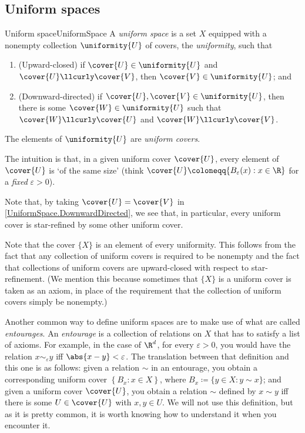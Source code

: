 \subsection{Uniform spaces}

\begin{dfn}{Uniform space}{UniformSpace}
A \emph{uniform space} is a set $X$ equipped with a nonempty collection $\uniformity{U}$ of covers, the \emph{uniformity}, such that
\begin{enumerate}
\item \label{UniformSpace.UpwardClosed}(Upward-closed) if $\cover{U}\in \uniformity{U}$ and $\cover{U}\llcurly \cover{V}$, then $\cover{V}\in \uniformity{U}$; and
\item \label{UniformSpace.DownwardDirected}(Downward-directed) if $\cover{U},\cover{V}\in \uniformity{U}$, then there is some $\cover{W}\in \uniformity{U}$ such that $\cover{W}\llcurly \cover{U}$ and $\cover{W}\llcurly \cover{V}$.
\end{enumerate}
\begin{rmk}
The elements of $\uniformity{U}$ are \emph{uniform covers}.
\end{rmk}
\begin{rmk}
The intuition is that, in a given uniform cover $\cover{U}$, every element of $\cover{U}$ is `of the same size' (think $\cover{U}\coloneqq \{ B_{\varepsilon}(x):x\in \R \}$ for a \emph{fixed} $\varepsilon >0$).
\end{rmk}
\begin{rmk}
Note that, by taking $\cover{U}=\cover{V}$ in \cref{UniformSpace.DownwardDirected}, we see that, in particular, every uniform cover is star-refined by some other uniform cover.
\end{rmk}
\begin{rmk}
Note that the cover $\{ X\}$ is an element of every uniformity.  This follows from the fact that any collection of uniform covers is required to be nonempty and the fact that collections of uniform covers are upward-closed with respect to star-refinement.  (We mention this because sometimes that $\{ X\}$ is a uniform cover is taken as an axiom, in place of the requirement that the collection of uniform covers simply be nonempty.)
\end{rmk}
\begin{rmk}
Another common way to define uniform spaces are to make use of what are called \emph{entourages}.  An \emph{entourage} is a collection of relations on $X$ that has to satisfy a list of axioms.  For example, in the case of $\R ^d$, for every $\varepsilon >0$, you would have the relation $x\sim _{\varepsilon}y$ iff $\abs{x-y}<\varepsilon$.  The translation between that definition and this one is as follows:  given a relation $\sim$ in an entourage, you obtain a corresponding uniform cover $\left\{ B_x:x\in X\right\}$, where $B_x\coloneqq \{ y\in X:y\sim x\}$; and given a uniform cover $\cover{U}$, you obtain a relation $\sim$ defined by $x\sim y$ iff there is some $U\in \cover{U}$ with $x,y\in U$.  We will not use this definition, but as it is pretty common, it is worth knowing how to understand it when you encounter it.

\end{rmk}
\end{dfn}
